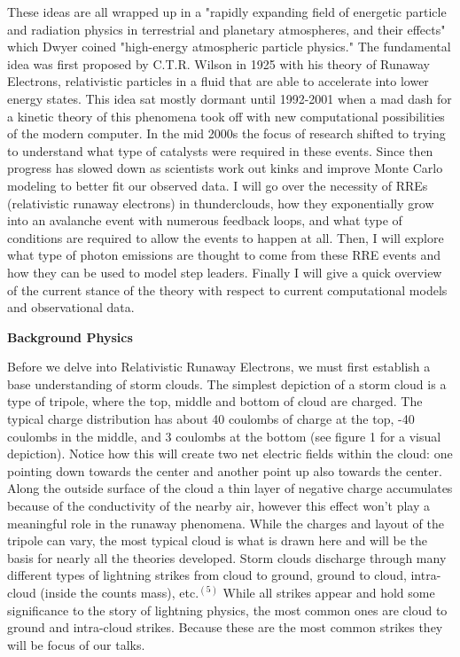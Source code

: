 \documentclass[11pt]{article}
\begin{document}
\begin{multicols*}{2}
    These ideas are all wrapped up in a "rapidly expanding field of energetic particle and radiation physics in terrestrial and planetary atmospheres, and their effects" which Dwyer coined "high-energy atmospheric particle physics." The fundamental idea was first proposed by C.T.R. Wilson in 1925 with his theory of Runaway Electrons, relativistic particles in a fluid that are able to accelerate into lower energy states. This idea sat mostly dormant until 1992-2001 when a mad dash for a kinetic theory of this phenomena took off with new computational possibilities of the modern computer. In the mid 2000s the focus of research shifted to trying to understand what type of catalysts were required in these events. Since then progress has slowed down as scientists work out kinks and improve Monte Carlo modeling to better fit our observed data. I will go over the necessity of RREs (relativistic runaway electrons) in thunderclouds, how they exponentially grow into an avalanche event with numerous feedback loops, and what type of conditions are required to allow the events to happen at all. Then, I will explore what type of photon emissions are thought to come from these RRE events and how they can be used to model step leaders. Finally I will give a quick overview of the current stance of the theory with respect to current computational models and observational data. 
    \newline
    

    \noindent
{\bf \LARGE Background Physics}

    Before we delve into Relativistic Runaway Electrons, we must first establish a base understanding of storm clouds. The simplest depiction of a storm cloud is a type of tripole, where the top, middle and bottom of cloud are charged. The typical charge distribution has about 40 coulombs of charge at the top, -40 coulombs in the middle, and 3 coulombs at the bottom (see figure 1 for a visual depiction). Notice how this will create two net electric fields within the cloud: one pointing down towards the center and another point up also towards the center. Along the outside surface of the cloud a thin layer of negative charge accumulates because of the conductivity of the nearby air, however this effect won't play a meaningful role in the runaway phenomena. While the charges and layout of the tripole can vary, the most typical cloud is what is drawn here and will be the basis for nearly all the theories developed. Storm clouds discharge through many different types of lightning strikes from cloud to ground, ground to cloud, intra-cloud (inside the counts mass), etc.$^{(5)}$ While all strikes appear and hold some significance to the story of lightning physics, the most common ones are cloud to ground and intra-cloud strikes. Because these are the most common strikes they will be focus of our talks.
    

\end{multicols*}
\end{document}
